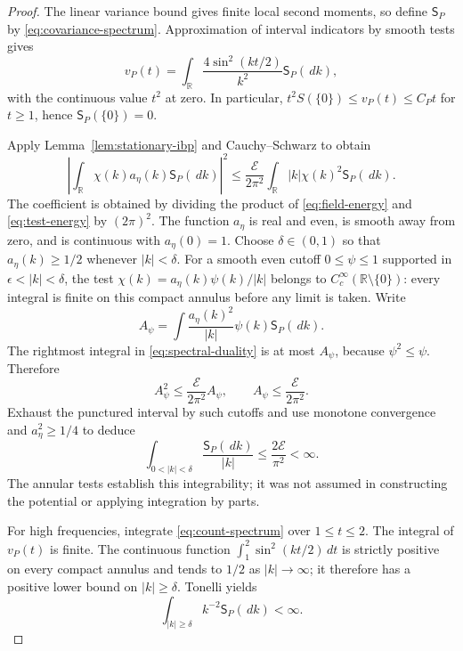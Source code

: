 \documentclass[11pt,reqno]{amsart}
\numberwithin{equation}{section}
\theoremstyle{definition}
\theoremstyle{remark}
\newcommand{\R}{\mathbb R}
\newcommand{\1}{\mathbf 1}
\newcommand{\Spec}{\mathsf S_P}
\newcommand{\dd}{\,d}
\newcommand{\calE}{\mathcal E}
\begin{document}
\begin{proof}
The linear variance bound gives finite local second moments, so define
$\Spec$ by \eqref{eq:covariance-spectrum}. Approximation of interval
indicators by smooth tests gives
\begin{equation}\label{eq:count-spectrum}
v_P(t)=\int_\R\frac{4\sin^2(kt/2)}{k^2}\Spec(\dd k),
\end{equation}
with the continuous value $t^2$ at zero. In particular,
$t^2S(\{0\})\le v_P(t)\le C_Pt$ for $t\ge1$, hence
$\Spec(\{0\})=0$.

Apply Lemma~\ref{lem:stationary-ibp} and Cauchy--Schwarz to obtain
\begin{equation}\label{eq:spectral-duality}
\left|\int_\R\chi(k)a_\eta(k)\Spec(\dd k)\right|^2
\le\frac{\calE}{2\pi^2}
      \int_\R |k|\chi(k)^2\Spec(\dd k).
\end{equation}
The coefficient is obtained by dividing the product of
\eqref{eq:field-energy} and \eqref{eq:test-energy} by $(2\pi)^2$. The function $a_\eta$ is real and
even, is smooth away from zero, and is continuous with $a_\eta(0)=1$.
Choose $\delta\in(0,1)$ so that $a_\eta(k)\ge1/2$ whenever
$|k|<\delta$.
For a smooth even cutoff $0\le\psi\le1$ supported in
$\epsilon<|k|<\delta$, the test
$\chi(k)=a_\eta(k)\psi(k)/|k|$ belongs to
$C_c^\infty(\R\setminus\{0\})$: every integral is finite on
this compact annulus before any limit is taken. Write
\[
A_\psi=\int\frac{a_\eta(k)^2}{|k|}\psi(k)\Spec(\dd k).
\]
The rightmost integral in \eqref{eq:spectral-duality} is at most
$A_\psi$, because $\psi^2\le\psi$. Therefore
\[
A_\psi^2\le\frac{\calE}{2\pi^2}A_\psi,
\qquad A_\psi\le\frac{\calE}{2\pi^2}.
\]
Exhaust the punctured interval by such cutoffs and use monotone
convergence and $a_\eta^2\ge1/4$ to deduce
\begin{equation}\label{eq:low-frequency}
\int_{0<|k|<\delta}\frac{\Spec(\dd k)}{|k|}
\le\frac{2\calE}{\pi^2}<\infty.
\end{equation}
The annular tests establish this integrability; it was not assumed
in constructing the potential or applying integration by parts.

For high frequencies, integrate \eqref{eq:count-spectrum} over
$1\le t\le2$. The integral of $v_P(t)$ is finite. The continuous
function $\int_1^2\sin^2(kt/2)\dd t$ is strictly positive on every
compact annulus and tends to $1/2$ as $|k|\to\infty$; it therefore
has a positive lower bound on $|k|\ge\delta$. Tonelli yields
\begin{equation}\label{eq:high-frequency}
\int_{|k|\ge\delta}k^{-2}\Spec(\dd k)<\infty.
\end{equation}


\end{proof}
\end{document}
